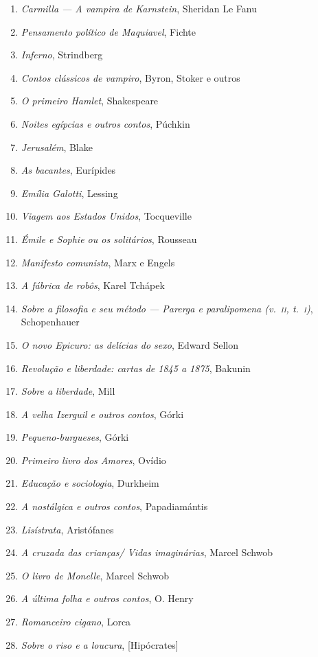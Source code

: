 \begin{enumerate}
\item \textit{Carmilla --- A vampira de Karnstein}, Sheridan Le Fanu
\item \textit{Pensamento político de Maquiavel}, Fichte
\item \textit{Inferno}, Strindberg
\item \textit{Contos clássicos de vampiro}, Byron, Stoker e outros
\item \textit{O primeiro Hamlet}, Shakespeare
\item \textit{Noites egípcias e outros contos}, Púchkin
\item \textit{Jerusalém}, Blake
\item \textit{As bacantes}, Eurípides
\item \textit{Emília Galotti}, Lessing
\item \textit{Viagem aos Estados Unidos}, Tocqueville
\item \textit{Émile e Sophie ou os solitários}, Rousseau 
\item \textit{Manifesto comunista}, Marx e Engels
\item \textit{A fábrica de robôs}, Karel Tchápek 
\item \textit{Sobre a filosofia e seu método --- Parerga e paralipomena (v.~\textsc{ii}, t.~\textsc{i})}, Schopenhauer 
\item \textit{O novo Epicuro: as delícias do sexo}, Edward Sellon
\item \textit{Revolução e liberdade: cartas de 1845 a 1875}, Bakunin
\item \textit{Sobre a liberdade}, Mill
\item \textit{A velha Izerguil e outros contos}, Górki
\item \textit{Pequeno-burgueses}, Górki
\item \textit{Primeiro livro dos Amores}, Ovídio
\item \textit{Educação e sociologia}, Durkheim
\item \textit{A nostálgica e outros contos}, Papadiamántis 
\item \textit{Lisístrata}, Aristófanes 
\item \textit{A cruzada das crianças/ Vidas imaginárias}, Marcel Schwob
\item \textit{O livro de Monelle}, Marcel Schwob
\item \textit{A última folha e outros contos}, O. Henry
\item \textit{Romanceiro cigano}, Lorca
\item \textit{Sobre o riso e a loucura}, [Hipócrates]

\end{enumerate}
